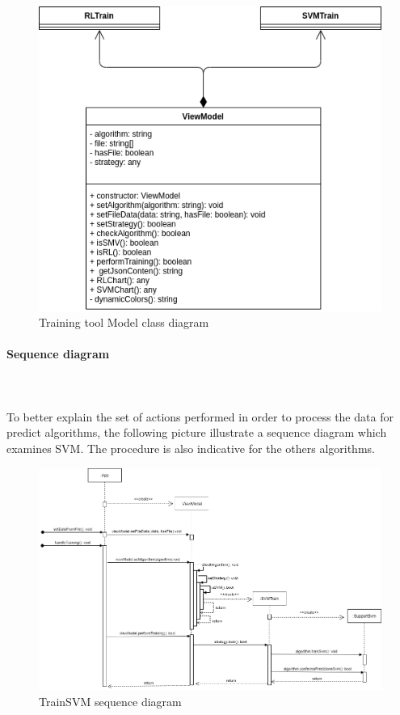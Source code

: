 \begin{figure}[H]
\centering
\includegraphics[scale=0.6]{../../../Diagrams/Classes_diagrams/tool_modelview.png}
\caption{Training tool Model class diagram}
\end{figure}

\paragraph*{Sequence diagram}\mbox{} \\ \mbox{} \\
To better explain the set of actions performed in order to process the data for
predict algorithms, the following picture illustrate a sequence diagram which examines SVM. The procedure is also indicative for the others algorithms.

\begin{landscape}
\begin{center}
\begin{figure}[H]
\centering
\includegraphics[scale=0.60]{../../../Diagrams/Sequence_diagrams/trainSVM.png}
\caption{TrainSVM sequence diagram}
\end{figure}
\end{center}
\end{landscape}

